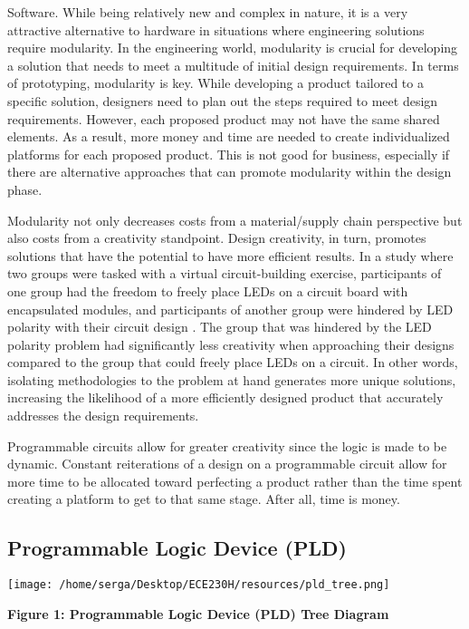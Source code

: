 \documentclass[12pt]{article}
\begin{document}
    Software. While being relatively new and complex in nature, 
    it is a very attractive alternative to hardware in situations where
    engineering solutions require modularity. In the engineering world, modularity
    is crucial for developing a solution that needs to meet a multitude of initial 
    design requirements. In terms of prototyping, modularity is key. While developing
    a product tailored to a specific solution, designers need to plan out the steps
    required to meet design requirements. However, each proposed product may not have
    the same shared elements. As a result, more money and time are needed to
    create individualized platforms for each proposed product. This is not
    good for business, especially if there are alternative approaches that can 
    promote modularity within the design phase. 
    
    Modularity not only decreases costs from a material/supply chain perspective but 
    also costs from a creativity standpoint. Design creativity, in turn, promotes 
    solutions that have the potential to have more efficient results. In a study where 
    two groups were tasked with a virtual circuit-building exercise, participants of 
    one group had the freedom to freely place LEDs on a circuit board with encapsulated 
    modules, and participants of another group were hindered by LED polarity 
    with their circuit design \autocite[149]{Sadler2016}. The group that was hindered 
    by the LED polarity problem had significantly less creativity when approaching 
    their designs compared to the group that could freely place LEDs on a circuit.
    In other words, isolating methodologies to the problem at hand generates more
    unique solutions, increasing the likelihood of a more efficiently designed 
    product that accurately addresses the design requirements.

    Programmable circuits allow for greater creativity since the logic is made to be
    dynamic. Constant reiterations of a design on a programmable circuit allow for 
    more time to be allocated toward perfecting a product rather than the time 
    spent creating a platform to get to that same stage. After all, time is money.

        \subsection{Programmable Logic Device (PLD)}
        
        \begin{center}
            \vspace{0.85cm}

            \texttt{[image: /home/serga/Desktop/ECE230H/resources/pld\_tree.png]}
            
            \vspace{0.5cm}

            \textbf{Figure 1: Programmable Logic Device (PLD) Tree Diagram} \autocite{cornell}
            \label{pld_tree_diagram}
        
        \end{center}
\end{document}
